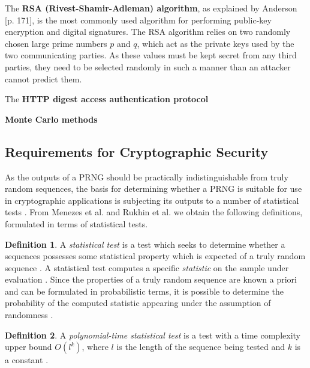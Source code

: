 \documentclass[12pt, titlepage]{report}
\theoremstyle{definition}
\newtheorem{definition}{Definition}
\begin{document}
The \textbf{RSA (Rivest-Shamir-Adleman) algorithm}, as explained by Anderson [p. 171]\cite{anderson2010security}, is the most commonly used algorithm for performing public-key encryption and digital signatures. The RSA algorithm relies on two randomly chosen large prime numbers $p$ and $q$, which act as the private keys used by the two communicating parties. As these values must be kept secret from any third parties, they need to be selected randomly in such a manner than an attacker cannot predict them.

The \textbf{HTTP digest access authentication protocol} 

\textbf{Monte Carlo methods} 



\subsection{Requirements for Cryptographic Security}\label{subsection:crypto_requirements}
As the outputs of a PRNG should be practically indistinguishable from truly random sequences, the basis for determining whether a PRNG is suitable for use in cryptographic applications is subjecting its outputs to a number of statistical tests \cite[p. 170]{menezes1996handbook}. From Menezes et al. and Rukhin et al. we obtain the following definitions, formulated in terms of statistical tests.

\begin{definition}
A \emph{statistical test} is a test which seeks to determine whether a sequences possesses some statistical property which is expected of a truly random sequence \cite[p. 175]{menezes1996handbook}. A statistical test computes a specific \emph{statistic} on the sample under evaluation \cite[p. 179]{menezes1996handbook}. Since the properties of a truly random sequence are known a priori and can be formulated in probabilistic terms, it is possible to determine the probability of the computed statistic appearing under the assumption of randomness \cite[s 1-3]{rukhin2001statistical}.
\end{definition}

\begin{definition}
A \emph{polynomial-time statistical test} is a test with a time complexity upper bound $O(l^k)$, where $l$ is the length of the sequence being tested and $k$ is a constant \cite[p. 171]{menezes1996handbook}.
\end{definition}

\end{document}
